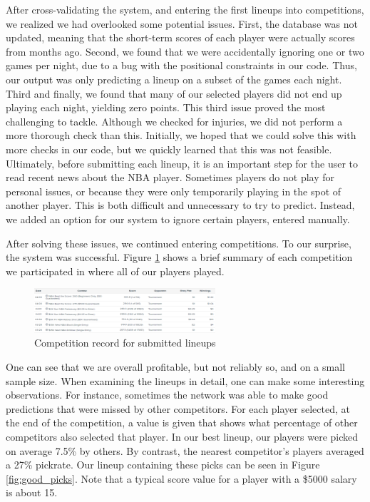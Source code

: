 After cross-validating the system, and entering the first lineups into competitions, we realized we had overlooked some potential issues. First, the database was not updated, meaning that the short-term scores of each player were actually scores from months ago. Second, we found that we were accidentally ignoring one or two games per night, due to a bug with the positional constraints in our code. Thus, our output was only predicting a lineup on a subset of the games each night. Third and finally, we found that many of our selected players did not end up playing each night, yielding zero points. This third issue proved the most challenging to tackle. Although we checked for injuries, we did not perform a more thorough check than this. Initially, we hoped that we could solve this with more checks in our code, but we quickly learned that this was not feasible. Ultimately, before submitting each lineup, it is an important step for the user to read recent news about the NBA player. Sometimes players do not play for personal issues, or because they were only temporarily playing in the spot of another player. This is both difficult and unnecessary to try to predict. Instead, we added an option for our system to ignore certain players, entered manually.

After solving these issues, we continued entering competitions. To our surprise, the system was successful. Figure \ref{fig:win_record} shows a brief summary of each competition we participated in where all of our players played.
\begin{figure}[ht]
    \centering
    \includegraphics[width=0.6\textwidth]{figures/fanduel_comp}
    \caption{Competition record for submitted lineups}
    \label{fig:win_record}
\end{figure}
One can see that we are overall profitable, but not reliably so, and on a small sample size. When examining the lineups in detail, one can make some interesting observations. For instance, sometimes the network was able to make good predictions that were missed by other competitors. For each player selected, at the end of the competition, a value is given that shows what percentage of other competitors also selected that player. In our best lineup, our players were picked on average 7.5\% by others. By contrast, the nearest competitor's players averaged a 27\% pickrate. Our lineup containing these picks can be seen in Figure \ref{fig:good_picks}. Note that a typical score value for a player with a \$5000 salary is about 15.

